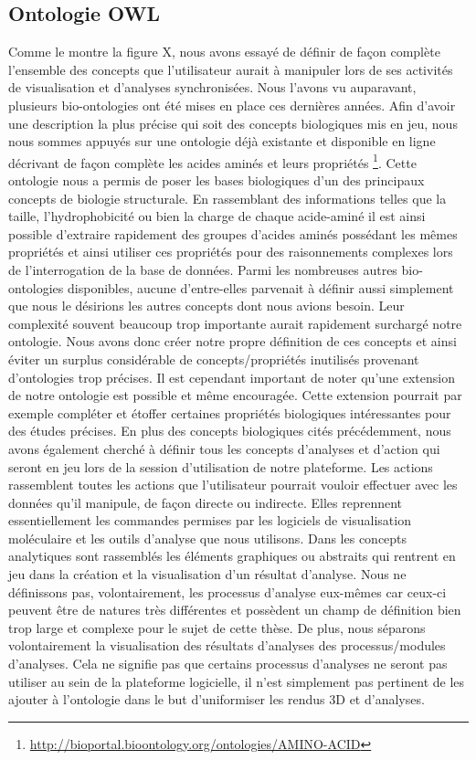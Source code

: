 \subsection{Ontologie OWL}

Comme le montre la figure X, nous avons essayé de définir de façon complète l'ensemble des concepts que l'utilisateur aurait à manipuler lors de ses activités de visualisation et d'analyses synchronisées. 
Nous l'avons vu auparavant, plusieurs bio-ontologies ont été mises en place ces dernières années. Afin d'avoir une description la plus précise qui soit des concepts biologiques mis en jeu, nous nous sommes appuyés sur une ontologie déjà existante et disponible en ligne décrivant de façon complète les acides aminés et leurs propriétés \footnote{\url{http://bioportal.bioontology.org/ontologies/AMINO-ACID}}. Cette ontologie nous a permis de poser les bases biologiques d'un des principaux concepts de biologie structurale. En rassemblant des informations telles que la taille, l'hydrophobicité ou bien la charge de chaque acide-aminé il est ainsi possible d'extraire rapidement des groupes d'acides aminés possédant les mêmes propriétés et ainsi utiliser ces propriétés pour des raisonnements complexes lors de l'interrogation de la base de données. Parmi les nombreuses autres bio-ontologies disponibles, aucune d'entre-elles parvenait à définir aussi simplement que nous le désirions les autres concepts dont nous avions besoin. Leur complexité souvent beaucoup trop importante aurait rapidement surchargé notre ontologie. Nous avons donc créer notre propre définition de ces concepts et ainsi éviter un surplus considérable de concepts/propriétés inutilisés provenant d'ontologies trop précises. Il est cependant important de noter qu'une extension de notre ontologie est possible et même encouragée. Cette extension pourrait par exemple compléter et étoffer certaines propriétés biologiques intéressantes pour des études précises.
En plus des concepts biologiques cités précédemment, nous avons également cherché à définir tous les concepts d'analyses et d'action qui seront en jeu lors de la session d'utilisation de notre plateforme. Les actions rassemblent toutes les actions que l'utilisateur pourrait vouloir effectuer avec les données qu'il manipule, de façon directe ou indirecte. Elles reprennent essentiellement les commandes permises par les logiciels de visualisation moléculaire et les outils d'analyse que nous utilisons. Dans les concepts analytiques sont rassemblés les éléments graphiques ou abstraits qui rentrent en jeu dans la création et la visualisation d'un résultat d'analyse. Nous ne définissons pas, volontairement, les processus d'analyse eux-mêmes car ceux-ci peuvent être de natures très différentes et possèdent un champ de définition bien trop large et complexe pour le sujet de cette thèse. De plus, nous séparons volontairement la visualisation des résultats d'analyses des processus/modules d'analyses. Cela ne signifie pas que certains processus d'analyses ne seront pas utiliser au sein de la plateforme logicielle, il n'est simplement pas pertinent de les ajouter à l'ontologie dans le but d'uniformiser les rendus 3D et d'analyses.
